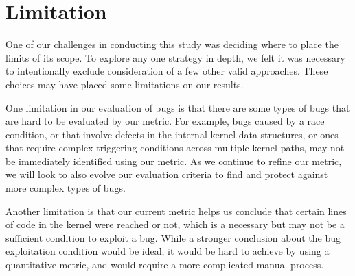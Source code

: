 \section{Limitation} 
\label{sec.limitation}

One of our challenges in conducting this study was deciding where to place the
limits of its scope. To explore any one strategy
in depth, we felt it was necessary to intentionally exclude consideration of
a few other valid approaches. These choices may have placed some limitations on our results.

One limitation in our evaluation of bugs is that there are some types of bugs that are hard to be evaluated by our metric. 
For example, bugs caused by a race condition, or that involve defects in the internal kernel data
structures, or ones that require complex triggering conditions across multiple kernel
paths, may not be immediately identified using our metric. As we continue to refine our metric, 
we will look to also evolve our evaluation criteria to find and protect against more complex types of bugs. 

Another limitation is that our current metric helps us conclude that certain lines of code in 
the kernel were reached or not, which is a necessary but may not be a sufficient condition 
to exploit a bug. While a stronger conclusion about the bug exploitation condition would be ideal, 
it would be hard to achieve by using a quantitative metric, and would require a more complicated manual process. 
